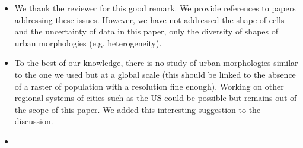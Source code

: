 \documentclass[11pt,a4paper,sans]{moderncv}        %
\begin{document}
\begin{itemize}
	\item We thank the reviewer for this good remark. We provide references to papers addressing these issues. However, we have not addressed the shape of cells and the uncertainty of data in this paper, only the diversity of shapes of urban morphologies (e.g. heterogeneity). 
	
	\item To the best of our knowledge, there is no study of urban morphologies similar to the one we used but at a global scale (this should be linked to the absence of a raster of population with a resolution fine enough). Working on other regional systems of cities such as the US could be possible but remains out of the scope of this paper. We added this interesting suggestion to the discussion.
	
	\item 
	

\end{itemize}
\end{document}
